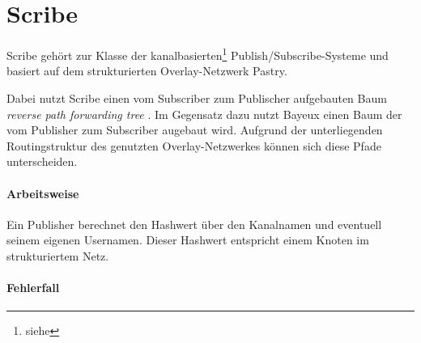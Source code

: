 \section*{Scribe}
\label{chap:related:scribe}
Scribe \cite{Castro2002Scribe} gehört zur Klasse der kanalbasierten\footnote{siehe } Publish/Subscribe-Systeme  und basiert auf dem strukturierten Overlay-Netzwerk Pastry.

Dabei nutzt Scribe einen vom Subscriber zum Publischer aufgebauten Baum \emph{reverse path forwarding tree} \cite{Dalal1978}. Im Gegensatz dazu nutzt Bayeux \cite{Zhuang2001} einen Baum der vom Publisher zum Subscriber augebaut wird. Aufgrund der unterliegenden Routingstruktur des genutzten Overlay-Netzwerkes können sich diese Pfade unterscheiden.

\cite{Rowstron2001} %

\paragraph{Arbeitsweise}
Ein Publisher berechnet den Hashwert über den Kanalnamen und eventuell seinem eigenen Usernamen. Dieser Hashwert entspricht einem Knoten im strukturiertem Netz.

\paragraph{Fehlerfall}
